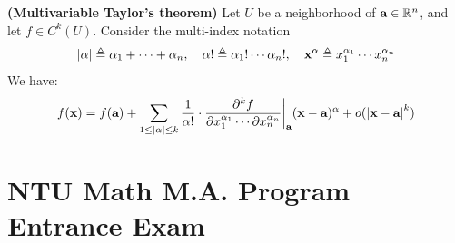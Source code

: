 \documentclass{report}
\begin{document}
\begin{theorem}
\label{THmTt}
\textbf{(Multivariable Taylor's theorem)} Let  $U$ be a neighborhood of $\textbf{a}\in\mathbb{R}^n$, and let $f\in C^k(U)$. Consider the   multi-index notation  
\begin{align*}
  \left|\alpha \right|\triangleq  \alpha_1 + \cdots + \alpha _n,\quad  \alpha ! \triangleq \alpha_1! \cdots \alpha_n!,\quad  \textbf{x}^{\alpha }\triangleq  x_1^{\alpha _1}\cdots x_n^{\alpha _n}   
\end{align*}
We have: 
\begin{align*}
f(\textbf{x})= f(\textbf{a})+\sum_{1\leq \left|\alpha \right|\leq k} \frac{1}{\alpha !}\cdot  \frac{\partial^k f}{\partial x_1^{\alpha _1} \cdots \partial x_n^{\alpha _n}} \bigg|_{\textbf{a}} (\textbf{x}-\textbf{a})^{\alpha } + o( \left|\textbf{x}-\textbf{a}\right|^k)
\end{align*}
\end{theorem}
\chapter{NTU Math M.A. Program Entrance Exam}
\end{document}
